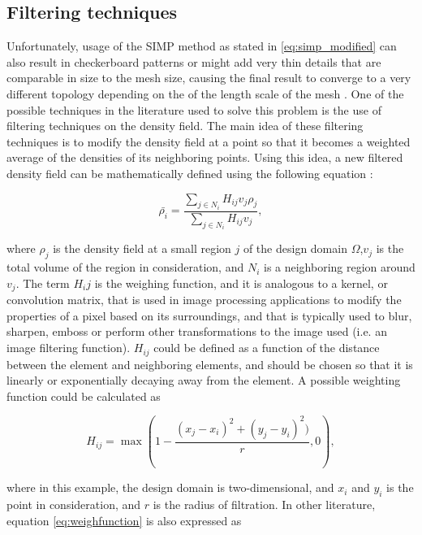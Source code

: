 \documentclass[../main.tex]{subfiles}
\begin{document}
\subsection{Filtering techniques}

Unfortunately, usage of the SIMP method as stated in \ref{eq:simp_modified} can also result in checkerboard patterns or might add very thin details that are comparable in size to the mesh size, causing the final result to converge to a very different topology depending on the of the length scale of the mesh \cite{wangProjectionMethodsConvergence2011a}. One of the possible techniques in the literature used to solve this problem is the use of filtering techniques on the density field. The main idea of these filtering techniques is to modify the density field at a point so that it becomes a weighted average of the densities of its neighboring points. Using this idea, a new filtered density field can be mathematically defined using the following equation \cite{liuEfficient3DTopology2014}:

\begin{equation}
  \bar{\rho_i} = \frac{\sum_{j \in N_i} H_{ij} v_j \rho_j} {\sum_{j \in N_i} H_{ij} v_j},
\end{equation}

where $\rho_j$ is the density field at a small region $j$ of the design domain $\Omega$,$v_j$ is the total volume of the region in consideration, and $N_i$ is a neighboring region around $v_j$. The term $H_ij$ is the weighing function, and it is analogous to a kernel, or convolution matrix, that is used in image processing applications to modify the properties of a pixel based on its surroundings, and that is typically used to blur, sharpen, emboss or perform other transformations to the image used (i.e. an image filtering function). $H_{ij}$ could be defined as a function of the distance between the element and neighboring elements, and should be chosen so that it is linearly or exponentially decaying away from the element. A possible weighting function could be calculated as 

\begin{equation}
  H_{ij} = \max(1 - \frac{(x_j - x_i)^2 + (y_j - y_i)^2)}{r}, 0),
  \label{eq:weighfunction}
\end{equation}

where in this example, the design domain is two-dimensional, and $x_i$ and $y_i$ is the point in consideration, and $r$ is the radius of filtration. In other literature, equation \ref{eq:weighfunction} is also expressed as \cite{liuEfficient3DTopology2014} 
\end{document}
